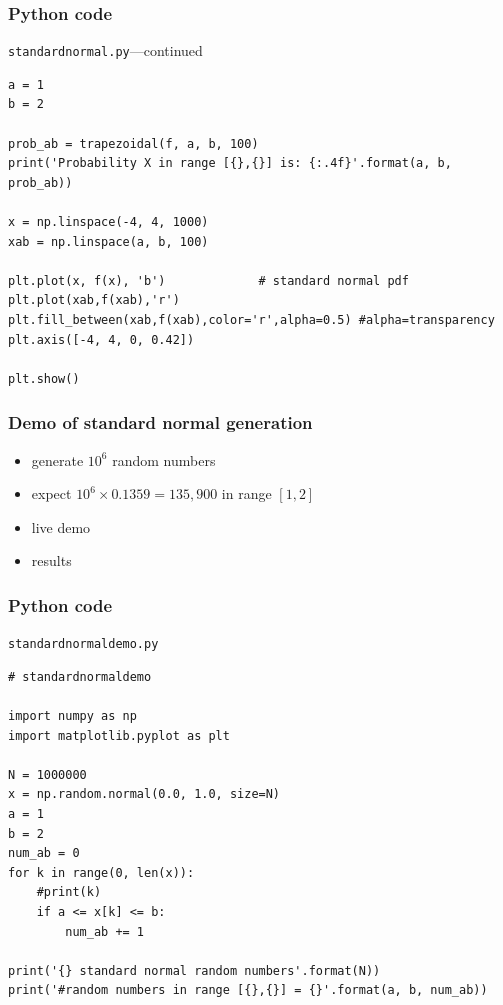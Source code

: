 \documentclass[english,14pt]{beamer}
\begin{document}
\begin{frame}[fragile]

\frametitle{Python code}

\texttt{standardnormal.py}---continued
\begin{lstlisting}[style=CStyle,basicstyle=\scriptsize]
a = 1
b = 2

prob_ab = trapezoidal(f, a, b, 100)
print('Probability X in range [{},{}] is: {:.4f}'.format(a, b, prob_ab))

x = np.linspace(-4, 4, 1000)
xab = np.linspace(a, b, 100)

plt.plot(x, f(x), 'b')             # standard normal pdf
plt.plot(xab,f(xab),'r')
plt.fill_between(xab,f(xab),color='r',alpha=0.5) #alpha=transparency
plt.axis([-4, 4, 0, 0.42])

plt.show()
\end{lstlisting}

\end{frame}


\begin{frame}[fragile]

\frametitle{Demo of standard normal generation}

\begin{itemize}
	\item generate $10^6$ random numbers
	\item expect $10^6 \times 0.1359 = 135,900$ in range $[1,2]$
	\item live demo
	\item results
\end{itemize}


\end{frame}


\begin{frame}[fragile]

\frametitle{Python code}

\texttt{standardnormaldemo.py}
\begin{lstlisting}[style=CStyle,basicstyle=\scriptsize]
# standardnormaldemo

import numpy as np
import matplotlib.pyplot as plt

N = 1000000
x = np.random.normal(0.0, 1.0, size=N)
a = 1
b = 2
num_ab = 0
for k in range(0, len(x)):
    #print(k)
    if a <= x[k] <= b:
        num_ab += 1

print('{} standard normal random numbers'.format(N))
print('#random numbers in range [{},{}] = {}'.format(a, b, num_ab))
\end{lstlisting}

\end{frame}
\end{document}
